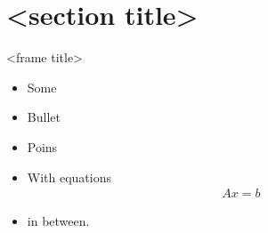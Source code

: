 \section{<section title>}


\begin{frame}{<frame title>}

\begin{itemize}
\item Some
\item Bullet
\item Poins
\item With equations
\begin{align*}
Ax = b
\end{align*}
\item in between.
\end{itemize}

\end{frame}
